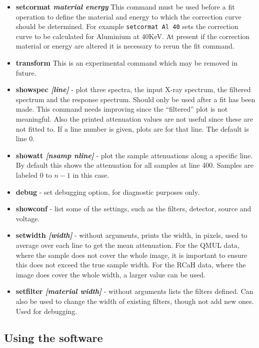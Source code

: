 \documentclass[a4paper,12pt]{article}
\begin{document}
\begin{itemize}
\item{\bf setcormat \it{material energy}} This command must be used before a fit operation to define the material and energy to which the correction
curve should be determined. For example \texttt{setcormat Al 40} sets the correction curve to be calculated for Aluminium at 40KeV.
At present if the correction material or energy are altered it is necessary to rerun the fit command.

\item{\bf transform} This is an experimental command which may be removed in future.

\item{\bf showspec \it{[line]}} - plot three spectra, the input X-ray spectrum, the filtered spectrum and the response spectrum.
Should only be used after a fit has been made. This command needs improving since the ``filtered'' plot is not meaningful.
Also the printed attenuation values are not useful since these are not fitted to.
If a line number is given, plots are for that line. The default is line 0.

\item{\bf showatt \it[nsamp nline]} - plot the sample attenuations along a specific line. By default this shows the
attenuation for all samples at line 400. Samples are labeled 0 to $n-1$ in this case.

\item{\bf debug} - set debugging option, for diagnostic purposes only.

\item{\bf showconf} - list some of the settings, such as the filters, detector, source and voltage.

\item{\bf setwidth \it[width]} - without arguments, prints the width, in pixels, used to average over each line to get the mean
attenuation. For the QMUL data, where the sample does not cover the whole image, it is important to ensure this does not
exceed the true sample width. For the RCaH data, where the image does cover the whole width, a larger value can be used.

\item{\bf setfilter \it[material width]} - without arguments lists the filters defined. Can also be used
to change the width of existing filters, though not add new ones. Used for debugging.

\end{itemize}

\subsection{Using the software}
\end{document}
